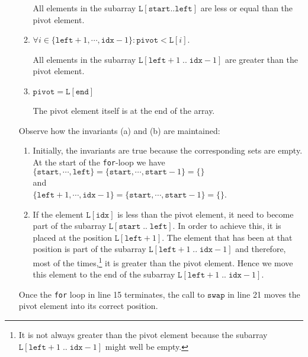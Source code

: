 \begin{enumerate}
\begin{enumerate}
            All elements in the subarray $\mathtt{L[start..left]}$ are less or equal than the pivot element.
      \item $\forall i \in \{ \mathtt{left}+1,\cdots,\mathtt{idx}-1\}:\mathtt{pivot} < \mathtt{L}[i]$.

            All elements in the subarray $\mathtt{L}[\mathtt{left}+1\;..\;\mathtt{idx}-1]$ are greater than the pivot
            element.
      \item $\mathtt{pivot} = \mathtt{L[end]}$

            The pivot element itself is at the end of the array.
      \end{enumerate}
      Observe how the invariants (a) and (b) are maintained:
      \begin{enumerate}
      \item Initially, the invariants are true because the corresponding sets are empty.
            At the start of the \texttt{for}-loop we have
            \\[0.2cm]
            \hspace*{1.3cm}
            $\{ \mathtt{start}, \cdots, \mathtt{left} \} = \{ \mathtt{start}, \cdots, \mathtt{start} - 1\} = \{\}$
            \\
            and
            \\
            \hspace*{1.3cm}
            $\{ \mathtt{left}+1,\cdots,\mathtt{idx}-1\} =  \{ \mathtt{start},\cdots,\mathtt{start}-1\}=\{\}$.
      \item If the element $\mathtt{L[idx]}$ is less than the
            pivot element, it need to become part of the subarray $\mathtt{L}[\mathtt{start}\;..\;\mathtt{left}]$.  In order to
            achieve this, it is placed at the position $\mathtt{L}[\mathtt{left}+1]$.  The element that has been at
            that position is part of the subarray $\mathtt{L}[\mathtt{left}+1\; ..\; \mathtt{idx}-1]$ and therefore, most of the times,\footnote{It is not always greater than the pivot element
      because the subarray $\mathtt{L}[\mathtt{left}+1\;..\;\mathtt{idx}-1]$ might well be empty.}
            it is greater than the pivot element.  
            Hence we move this element to the end of the subarray $\mathtt{L}[\mathtt{left}+1\;..\;\mathtt{idx}-1]$.
      \end{enumerate}
      Once the \texttt{for} loop in line 15 terminates, the call to $\mathtt{swap}$ in line 21 moves
      the pivot element into its correct position.  
\end{enumerate}


